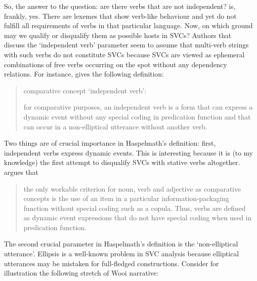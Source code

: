 So, the answer to the question: are there verbs that are not independent? is, frankly, yes. There are lexemes that show verb-like behaviour and yet do not fulfill all requirements of verbs in that particular language. Now, on which ground may we qualify or disqualify them as possible hosts in SVCs? Authors that discuss the `independent verb' parameter seem to assume that multi-verb strings with such verbs do not constitute SVCs because SVCs are viewed as ephemeral combinations of free verbs occurring on the spot without any dependency relations. For instance, \citet[303]{haspelmath2016serial} gives the following definition: \begin{quote}comparative concept `independent verb’:

for comparative purposes, an independent verb is a form that can express a dynamic event without any special coding in predication function and that can occur in a non-elliptical utterance without another verb.\end{quote}

Two things are of crucial importance in Haspelmath's definition: first, independent verbs express dynamic events. This is interesting because it is (to my knowledge) the first attempt to disqualify SVCs with stative verbs altogether. \citet[302]{haspelmath2016serial} argues that \begin{quote}the only workable criterion for noun, verb and adjective as comparative concepts is the use of an item in a particular information-packaging function without special coding such as a copula. Thus, verbs are defined as dynamic event expressions that do not have special coding when used in predication function.\end{quote}

The second crucial parameter in Haspelmath's definition is the `non-elliptical utterance'. Ellipsis is a well-known problem in SVC analysis because elliptical utterances may be mistaken for full-fledged constructions. Consider for illustration the following stretch of Wooi narrative:



